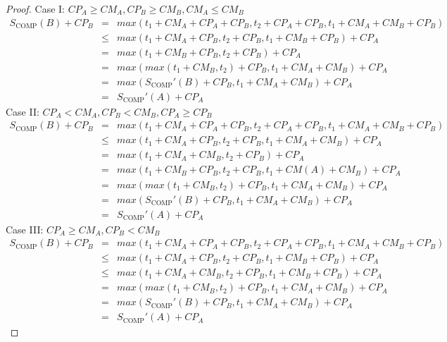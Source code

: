 \documentclass[sigconf]{acmart}
\newcommand{\scomp}{\ensuremath{{S}_{\text{COMP}}}}
\begin{document}
\begin{proof}
		Case I: $CP_A \ge CM_A, CP_B \ge CM_B, CM_A \le CM_B$
		\begin{eqnarray*}
			\scomp(B) + CP_B & = & max(t_1 + CM_A + CP_A + CP_B, t_2 + CP_A + CP_B, t_1 + CM_A + CM_B + CP_B)\\
			& \le& max(t_1 + CM_A + CP_B, t_2  + CP_B, t_1  + CM_B + CP_B) + CP_A\\
			& = & max( t_1  + CM_B + CP_B, t_2  + CP_B) + CP_A \\
			& = & max(max(t_1 + CM_B, t_2) + CP_B, t_1 + CM_A + CM_B) + CP_A\\
			& = & max(\scomp'(B) + CP_B, t_1 + CM_A + CM_B) + CP_A \\
			& = & \scomp'(A) + CP_A
		\end{eqnarray*}
		Case II: $CP_A < CM_A, CP_B < CM_B, CP_A \ge CP_B$
		\begin{eqnarray*}
			\scomp(B) + CP_B & = & max(t_1 + CM_A + CP_A + CP_B, t_2 + CP_A + CP_B, t_1 + CM_A + CM_B + CP_B)\\
			& \le & max(t_1 + CM_A + CP_B, t_2+CP_B, t_1 + CM_A + CM_B) + CP_A\\
			& = & max(t_1 + CM_A + CM_B, t_2+ CP_B) + CP_A \\
			& = & max(t_1 + CM_B + CP_B, t_2 + CP_B, t_1 + CM(A) + CM_B) + CP_A \\
			& = & max(max(t_1 + CM_B, t_2) + CP_B, t_1 + CM_A + CM_B) + CP_A \\
			& = & max(\scomp'(B) + CP_B, t_1 + CM_A +CM_B) + CP_A \\
			& = & \scomp'(A) + CP_A
		\end{eqnarray*}
		Case III: $CP_A \ge CM_A, CP_B < CM_B$
		\begin{eqnarray*}
			\scomp(B) + CP_B & = & max(t_1 + CM_A + CP_A + CP_B, t_2 + CP_A + CP_B, t_1 + CM_A + CM_B + CP_B)\\
			& \le & max(t_1 + CM_A + CP_B, t_2 + CP_B, t_1 + CM_B + CP_B) + CP_A\\
			& \le & max(t_1 + CM_A + CM_B, t_2 + CP_B, t_1 + CM_B + CP_B) + CP_A \\
			& = & max(max(t_1 + CM_B, t_2) + CP_B, t_1 + CM_A + CM_B) + CP_A \\
			& = & max(\scomp'(B) + CP_B, t_1 + CM_A +CM_B) + CP_A \\
			& = & \scomp'(A) + CP_A
		\end{eqnarray*}
	\end{proof}
	
\end{document}
